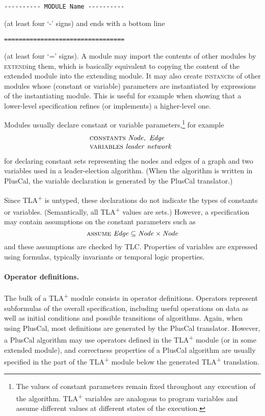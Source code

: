 \documentclass[11pt,fleqn]{article}
\newcommand{\tlaplus}{TLA\textsuperscript{+}\xspace}
\newcommand{\kw}[1]{\textnormal{\textsc{#1}}}
\newcommand{\EXTEND}{\kw{extend}}
\newcommand{\INSTANCE}{\kw{instance}}
\newcommand{\CONSTANTS}{\kw{constants}}
\newcommand{\VARIABLES}{\kw{variables}}
\newcommand{\ASSUME}{\kw{assume}}
\begin{document}
\verb|---------- MODULE Name ----------|

\noindent%
(at least four `-' signs) and ends with a bottom line

\verb|=================================|

\noindent%
(at least four `=' signs). A module may import the contents of other modules by
\EXTEND{}ing them, which is basically equivalent to copying the content of the
extended module into the extending module. It may also create \INSTANCE{}s of
other modules whose (constant or variable) parameters are instantiated by
expressions of the instantiating module. This is useful for example when
showing that a lower-level specification refines (or implements) a higher-level
one.

Modules usually declare constant or variable parameters,\footnote{The values of
  constant parameters remain fixed throughout any execution of the algorithm.
  \tlaplus variables are analogous to program variables and assume different
  values at different states of the execution.} for example
%
\[\begin{array}{@{}l}
    \CONSTANTS\ \mathit{Node},\ \mathit{Edge}\\
    \VARIABLES\ \mathit{leader}\ \mathit{network}
\end{array}\]
%
for declaring constant sets representing the nodes and edges of a graph and two
variables used in a leader-election algorithm. (When the algorithm is written in
PlusCal, the variable declaration is generated by the PlusCal translator.)

Since \tlaplus is untyped, these declarations do not indicate the types of
constants or variables. (Semantically, all \tlaplus values are sets.) However, a
specification may contain assumptions on the constant parameters such as
%
\[ \ASSUME\ \mathit{Edge} \subseteq \mathit{Node} \times \mathit{Node}  \]
%
and these assumptions are checked by TLC. Properties of variables are expressed
using formulas, typically invariants or temporal logic properties.


\paragraph{Operator definitions.}

The bulk of a \tlaplus module consists in operator definitions. Operators
represent subformulas of the overall specification, including useful operations
on data as well as initial conditions and possible transitions of algorithms.
Again, when using PlusCal, most definitions are generated by the PlusCal
translator. However, a PlusCal algorithm may use operators defined in the
\tlaplus module (or in some extended module), and correctness properties of a
PlusCal algorithm are usually specified in the part of the \tlaplus module below
the generated \tlaplus translation.
\end{document}
